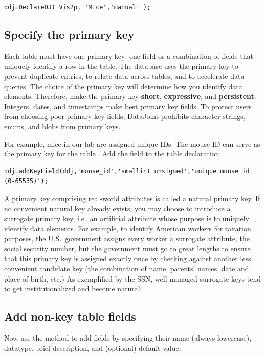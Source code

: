 \documentclass[10pt]{article}
\begin{document}
\begin{lstlisting}
ddj=DeclareDJ( Vis2p, 'Mice','manual' );
\end{lstlisting}

\subsection{Specify the primary key}  Each table must have one primary key: one field or a combination of fields that uniquely identify a row in the table.  The database uses the primary key to prevent duplicate entries, to relate data across tables, and to accelerate data queries. The choice of the primary key will determine how you identify data elements. Therefore, make the primary key {\bf short}, {\bf expressive}, and {\bf persistent}. Integers, dates, and timestamps make best primary key fields. To protect users from choosing poor primary key fields, DataJoint prohibits character strings, enums, and blobs from primary keys.

For example, mice in our lab are assigned unique IDs. The mouse ID can serve as the primary key for the table .  Add the field  to the table declaration:

\begin{lstlisting}
ddj=addKeyField(ddj,'mouse_id','smallint unsigned','unique mouse id (0-65535)');
\end{lstlisting}

A primary key comprising real-world attributes is called a \href{http://en.wikipedia.org/wiki/Natural_key}{natural primary key}.  If no convenient natural key already exists, you may choose to introduce a \href{http://en.wikipedia.org/wiki/Surrogate_key}{surrogate primary key}, i.e.~an artificial attribute whose purpose is to uniquely identify data elements.  For example, to identify American workers for taxation purposes, the U.S.~government assigns every worker a surrogate attribute, the social security number, but the government must go to great lengths to ensure that this primary key is assigned exactly once by checking against another less convenient candidate key (the combination of name, parents' names, date and place of birth, etc.)  As exemplified by the SSN, well managed surrogate keys tend to get institutionalized and become natural.  

\subsection{Add non-key table fields}
Now use the  method to add fields by specifying their name (always lowercase), datatype, brief description, and (optional) default value:
\end{document}
